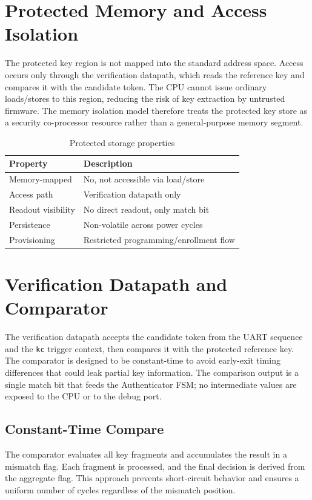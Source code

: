 \section{Protected Memory and Access Isolation}
The protected key region is not mapped into the standard address space. Access occurs only
through the verification datapath, which reads the reference key and compares it with the
candidate token. The CPU cannot issue ordinary loads/stores to this region, reducing the risk
of key extraction by untrusted firmware. The memory isolation model therefore treats the
protected key store as a security co-processor resource rather than a general-purpose memory
segment.

\begin{table}[H]
  \centering
  \caption{Protected storage properties}
  \label{tab:protected-storage}
  \begin{tabular}{@{}p{4.0cm}p{6.2cm}@{}}
    \toprule
    \textbf{Property} & \textbf{Description} \\
    \midrule
    Memory-mapped & No, not accessible via load/store \\
    Access path & Verification datapath only \\
    Readout visibility & No direct readout, only match bit \\
    Persistence & Non-volatile across power cycles \\
    Provisioning & Restricted programming/enrollment flow \\
    \bottomrule
  \end{tabular}
\end{table}

\section{Verification Datapath and Comparator}
The verification datapath accepts the candidate token from the UART sequence and the
\texttt{kc} trigger context, then compares it with the protected reference key. The
comparator is designed to be constant-time to avoid early-exit timing differences that
could leak partial key information. The comparison output is a single match bit that feeds
the Authenticator FSM; no intermediate values are exposed to the CPU or to the debug port.

\subsection{Constant-Time Compare}
The comparator evaluates all key fragments and accumulates the result in a mismatch flag.
Each fragment is processed, and the final decision is derived from the aggregate flag. This
approach prevents short-circuit behavior and ensures a uniform number of cycles regardless
of the mismatch position.

